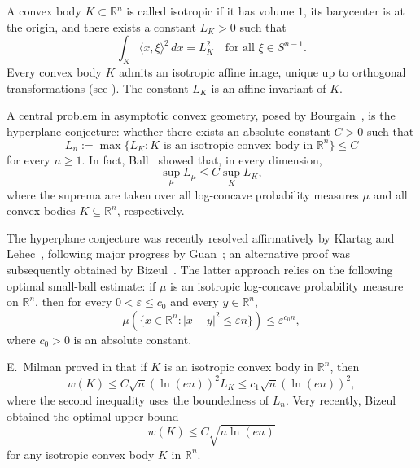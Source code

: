 \documentclass[10pt,a4paper]{amsart}
\numberwithin{equation}{section}
\newcommand{\ls}{\leqslant}
\newcommand{\gr}{\geqslant}
\begin{document}
A convex body $K \subset \mathbb{R}^n$ is called {isotropic} if it has volume $1$, its barycenter is at the origin, and there exists a constant $L_K > 0$ such that
\[\int_K \langle x, \xi \rangle^2 \, dx = L_K^2\quad\text{for all } \xi \in S^{n-1}.\]
Every convex body $K$ admits an isotropic affine image, unique up to orthogonal transformations (see \cite{BGVV-book}).
The constant $L_K$ is an affine invariant of $K$. 

A central problem in asymptotic convex geometry, posed by Bourgain~\cite{Bourgain-1986},
is the hyperplane conjecture: whether there exists an absolute constant $C>0$
such that
\[L_n:=\max\{L_K:K\text{ is an isotropic convex body in }\mathbb{R}^n\}\ls C\]
for every $n\gr 1$. In fact, Ball~\cite{Ball-1988} showed that, in every
dimension,
\[\sup_\mu L_\mu\ls C\sup_K L_K,\]
where the suprema are taken over all log-concave probability measures $\mu$ and
all convex bodies $K\subseteq\mathbb{R}^n$, respectively.

The hyperplane conjecture was recently resolved affirmatively by
Klartag and Lehec~\cite{KL}, following major progress by Guan~\cite{Guan};
an alternative proof was subsequently obtained by Bizeul~\cite{Bizeul-2025}.
The latter approach relies on the following optimal small-ball estimate:
if $\mu$ is an isotropic log-concave probability measure on $\mathbb{R}^n$,
then for every $0<\varepsilon\ls c_0$ and every $y\in\mathbb{R}^n$,
\begin{equation}\label{eq:optimal-small-ball}
\mu\left(\{x\in\mathbb{R}^n:|x-y|^2\ls\varepsilon n\}\right)
\ls \varepsilon^{c_0 n},
\end{equation}
where $c_0>0$ is an absolute constant.

E.~Milman proved in \cite{EMilman-2014} that if $K$ is an isotropic convex body in ${\mathbb R}^n$, then
$$w(K) \ls C \sqrt{n} (\ln(en))^2 L_K \ls c_1 \sqrt{n} (\ln (en))^2,$$
where the second inequality uses the boundedness of $L_n$. Very recently, Bizeul \cite{Bizeul-M-2026} obtained the optimal upper bound
\begin{equation}\label{eq:Bizeul-M}
w(K) \ls C\sqrt{n\ln(en)}
\end{equation}
for any isotropic convex body $K$ in ${\mathbb R}^n$.

\medskip 
\end{document}
